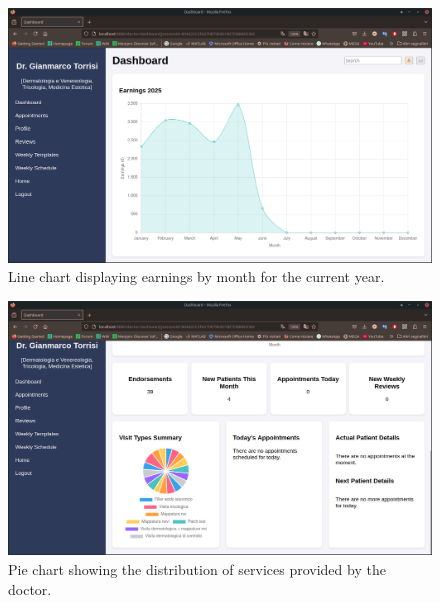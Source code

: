 \begin{figure}[!h]
    \centering
	\includegraphics[scale=0.30]{resources/screenshots/doctor_ui/earnings_linechart.png}
    \caption{Line chart displaying earnings by month for the current year.}
    \label{fig:earnings_linechart}
\end{figure}

\begin{figure}[!h]
    \centering
    \includegraphics[scale=0.30]{resources/screenshots/doctor_ui/dashboard_bottom.png}
    \caption{Pie chart showing the distribution of services provided by the doctor.}
    \label{fig:services_piechart}
\end{figure}

